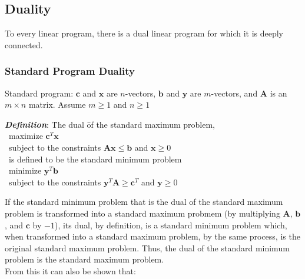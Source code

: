 \documentclass[10pt,letterpaper]{scrartcl}
\newcommand{\boph}[1]{\emph{\textbf{#1}}} %
\begin{document}
\subsection{Duality}
To every linear program, there is a dual linear program for which it is deeply connected. \\
\subsubsection*{Standard Program Duality}
Standard program: $\mathbf{c}$ and $\mathbf{x}$ are $n$-vectors, $\mathbf{b}$ and $\mathbf{y}$ are $m$-vectors, and $\mathbf{A}$ is an $m\times n$ matrix. Assume $m\geq 1$ and $n\geq 1$ \\
\begin{tabbing}
\boph{Definition}: \= The dual \= of the standard maximum problem, \\
\>\>\ maximize $\mathbf{c}^T\mathbf{x}$ \\
\>\>\ subject to the constraints $\mathbf{Ax}\leq\mathbf{b}$ and $\mathbf{x}\geq 0$ \\
\>\ is defined to be the standard minimum problem \\
\>\>\ minimize $\mathbf{y}^T\mathbf{b}$ \\
\>\>\ subject to the constraints $\mathbf{y}^T\mathbf{A}\geq\mathbf{c}^T$ and $\mathbf{y}\geq 0$\end{tabbing}
If the standard minimum problem that is the dual of the standard maximum problem is transformed into a standard maximum probmem (by multiplying $\mathbf{A}$, $\mathbf{b}$, and $\mathbf{c}$ by $-1$), its dual, by definition, is a standard minimum problem which, when transformed into a standard maximum problem, by the same process, is the original standard maximum problem. Thus, the dual of the standard minimum problem is the standard maximum problem. \\
From this it can also be shown that: \\
\end{document}
